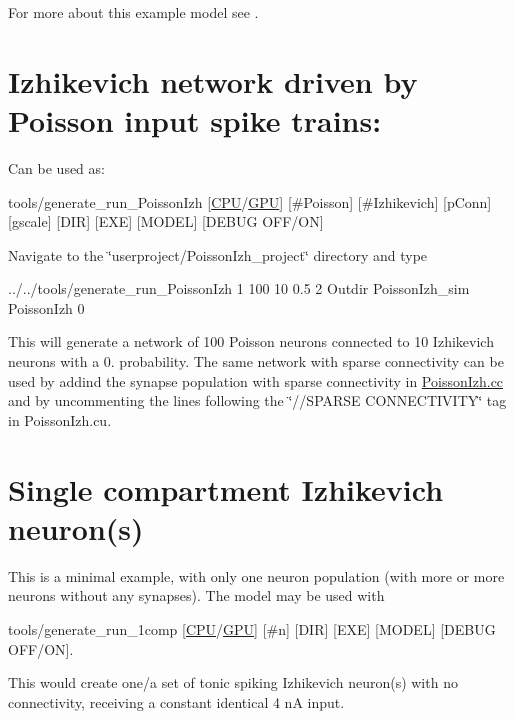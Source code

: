 For more about this example model see \cite{nowotny2005self}.\hypertarget{2_examples_ex_poissonizh}{}\section{Izhikevich network driven by Poisson input spike trains\+:}\label{2_examples_ex_poissonizh}
Can be used as\+: 
\begin{DoxyCode}
tools/generate\_run\_PoissonIzh [\hyperlink{README_8txt_a74a069e3c75797de2636c4dd14daa147}{CPU}/\hyperlink{modelSpec_8h_a39cb9803524b6f3b783344b2f89867b4}{GPU}] [#Poisson] [#Izhikevich] [pConn] [gscale] [DIR] [EXE] [MODEL]
       [DEBUG OFF/ON]
\end{DoxyCode}
 Navigate to the \char`\"{}userproject/\+Poisson\+Izh\+\_\+project\char`\"{} directory and type 
\begin{DoxyCode}
../../tools/generate\_run\_PoissonIzh 1 100 10 0.5 2 Outdir PoissonIzh\_sim PoissonIzh 0
\end{DoxyCode}
 This will generate a network of 100 Poisson neurons connected to 10 Izhikevich neurons with a 0. probability. The same network with sparse connectivity can be used by addind the synapse population with sparse connectivity in \hyperlink{PoissonIzh_8cc}{Poisson\+Izh.\+cc} and by uncommenting the lines following the \char`\"{}//\+S\+P\+A\+R\+S\+E C\+O\+N\+N\+E\+C\+T\+I\+V\+I\+T\+Y\char`\"{} tag in Poisson\+Izh.\+cu.\hypertarget{2_examples_Ex_OneComp}{}\section{Single compartment Izhikevich neuron(s)}\label{2_examples_Ex_OneComp}
This is a minimal example, with only one neuron population (with more or more neurons without any synapses). The model may be used with 
\begin{DoxyCode}
tools/generate\_run\_1comp [\hyperlink{README_8txt_a74a069e3c75797de2636c4dd14daa147}{CPU}/\hyperlink{modelSpec_8h_a39cb9803524b6f3b783344b2f89867b4}{GPU}] [#n] [DIR] [EXE] [MODEL] [DEBUG OFF/ON].
\end{DoxyCode}
 This would create one/a set of tonic spiking Izhikevich neuron(s) with no connectivity, receiving a constant identical 4 n\+A input.

